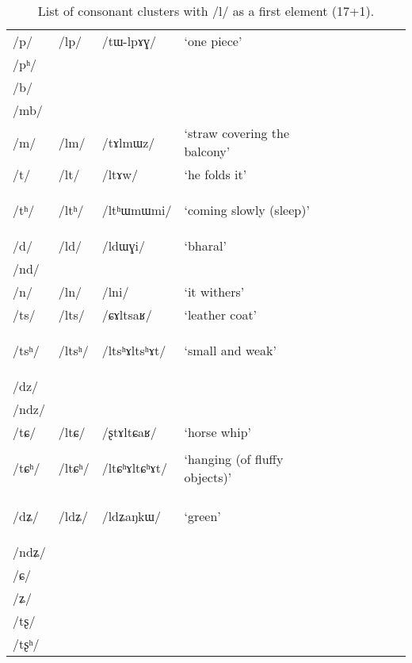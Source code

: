 \documentclass[12pt]{article}
\newcommand{\ipa}[1]{\mbox{\phon/#1/}}
\newcommand{\deux}[1]{\ipa{#1}\addtocounter{2clusters}{1}}
\newcommand{\tib}[1]{\cellcolor{lightgray}\textbf{#1}}
\newcommand{\idph}[1]{\cellcolor{gray}\textbf{#1}}
\newcommand{\resetcounters}[2]{
\newcounter{#1}
\newcounter{#2}
 \setcounter{#1}{\value{2clusters}}
  \setcounter{#2}{\value{3clusters}}
 \setcounter{2clusters}{0}
  \setcounter{3clusters}{0}
}
\begin{document}
\resetcounters{2szC}{3szC} %

  \begin{table}
 \caption{List of consonant clusters with \ipa{l} as a first element (17+1).} \label{prein.l}  
\begin{tabular}{lllllllllll}
\toprule
\ipa{p}  & 	 \deux{lp}  & 	 \ipa{tɯ-lpɤɣ}  & 	 `one piece'  & 	\\
\ipa{pʰ}  & 	  & 	  & 	  & 	\\
\ipa{b}  & 	  & 	  & 	  & 	\\
\ipa{mb}  & 	  & 	  & 	  & 	\\
\ipa{m}  & 	 \deux{lm}  & 	 \ipa{tɤlmɯz}  & 	 `straw covering the balcony'  & 	\\
\ipa{t}  & 	 \deux{lt}  & 	 \ipa{ltɤw}  & 	 `he  folds it'  & 	\\
\ipa{tʰ}  & 	 \deux{ltʰ} \idph{}  & 	 \ipa{ltʰɯmɯmi}  & 	 `coming slowly (sleep)'  & 	\\
\ipa{d}  & 	 \deux{ld}  & 	 \ipa{ldɯɣi}  & 	 `bharal'  & 	\\
\ipa{nd}  & 	  & 	  & 	  & 	\\
\ipa{n}  & 	 \deux{ln}  & 	 \ipa{lni}  & 	 `it withers'  & 	\\
\ipa{ts}  & 	 \deux{lts}  & 	 \ipa{ɕɤltsaʁ}  & 	 `leather coat'  & 	\\
\ipa{tsʰ}  & 	 \deux{ltsʰ} \idph{}  & 	 \ipa{ltsʰɤltsʰɤt}  & 	 `small and weak'  & 	\\
\ipa{dz}  & 	  & 	  & 	  & 	\\
\ipa{ndz}  & 	  & 	  & 	  & 	\\
\ipa{tɕ}  & 	 \deux{ltɕ}  & 	 \ipa{ʂtɤltɕaʁ}  & 	 `horse whip'  & 	\\
\ipa{tɕʰ}  & 	 \deux{ltɕʰ} \idph{}  & 	 \ipa{ltɕʰɤltɕʰɤt}  & 	 `hanging (of fluffy objects)'  & 	\\
\ipa{dʑ}  & 	 \deux{ldʑ} \tib{}  & 	 \ipa{ldʑaŋkɯ}  & 	 `green'  & 	\\
\ipa{ndʑ}  & 	  & 	  & 	  & 	\\
\ipa{ɕ}  & 	  & 	  & 	  & 	\\
\ipa{ʑ}  & 	  & 	  & 	  & 	\\
\ipa{tʂ}  & 	  & 	  & 	  & 	\\
\ipa{tʂʰ}  & 	  & 	  & 	  & 	\\

\end{tabular}
\end{table}
\end{document}
